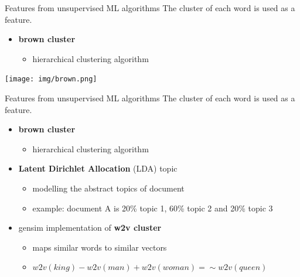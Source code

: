 \documentclass[12pt, tikz]{beamer}
\begin{document}
\begin{frame}[fragile]{Features from unsupervised ML algorithms}
	The cluster of each word is used as a feature.
	\begin{itemize}
		\item \textbf{brown cluster}
		\begin{itemize}
			\item hierarchical clustering algorithm
		\end{itemize}		
	\end{itemize}
	\begin{center}
		\texttt{[image: img/brown.png]}
	\end{center}
	
\end{frame}

\begin{frame}[fragile]{Features from unsupervised ML algorithms}
	The cluster of each word is used as a feature.
	\begin{itemize}
		\item<1-> \textbf{brown cluster}
		\begin{itemize}
			\item hierarchical clustering algorithm
		\end{itemize}
		\item<1-> \textbf{Latent Dirichlet Allocation} (LDA) topic
		\begin{itemize}
			\item modelling the abstract topics of document
			\item example: document A is 20\% topic 1, 60\% topic 2 and 20\% topic 3
		\end{itemize}
		\item<2-> gensim implementation of \textbf{w2v cluster}
		\begin{itemize}
			\item maps similar words to similar vectors
			\item $w2v(king) - w2v(man) + w2v(woman) = \sim w2v(queen)$
		\end{itemize}
	\end{itemize}
\end{frame}
\end{document}
